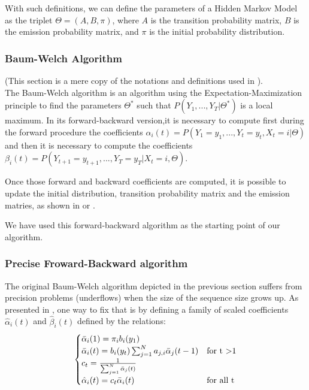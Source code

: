 With such definitions, we can define the parameters of a Hidden Markov Model as the triplet $\Theta = (A, B, \pi)$, where $A$ is the transition probability matrix, $B$ is the emission probability matrix, and $\pi$ is the initial probability distribution.
\subsubsection*{Baum-Welch Algorithm}
(This section is a mere copy of the notations and definitions used in \cite{wiki:BaumWelch_algorithm}).\\
The Baum-Welch algorithm is an algorithm using the Expectation-Maximization principle to find the parameters $\Theta^*$ such that $P(Y_1,...,Y_T| \Theta^* )$ is a local maximum.
In its forward-backward version,it is necessary to compute first during the forward procedure the coefficients $\alpha_i(t) = P(Y_1=y_1,...,Y_t = y_t, X_t = i | \Theta )$ and then it is necessary to compute the coefficients $\beta_i(t) = P(Y_{t+1}=y_{t+1},...,Y_T = y_T| X_t = i, \Theta )$.

Once those forward and backward coefficients are computed, it is possible to update the initial distribution, transition probability matrix and the emission matries, as shown in \cite{rabiner1989tutorial} or \cite{wiki:BaumWelch_algorithm}.

We have used this forward-backward algorithm as the starting point of our algorithm.
\subsubsection*{Precise Froward-Backward algorithm}
The original Baum-Welch algorithm depicted in the previous section suffers from precision problems (underflows) when the size of the sequence size grows up.
As presented in \cite{rabiner1989tutorial}, one way to fix that is by defining a family of scaled coefficients $\hat{\alpha}_i(t)$ and $\hat{\beta}_i(t)$ defined by the relations:
\begin{equation}
\begin{cases}
\bar{\alpha}_i(1) = \pi_i b_i(y_1) & \\
\bar{\alpha}_i(t) = b_i(y_t)\sum_{j=1}^{N}{a_{j,i}\bar{\alpha}_j(t-1)} & \text{for t \textgreater 1} \\
c_t = \frac{1}{\sum^N_{j=1} \bar{\alpha}_j(t)} & \\
\hat{\alpha}_i(t) = c_t \bar{\alpha}_i(t) & \text{for all t}
\end{cases}
\end{equation}

